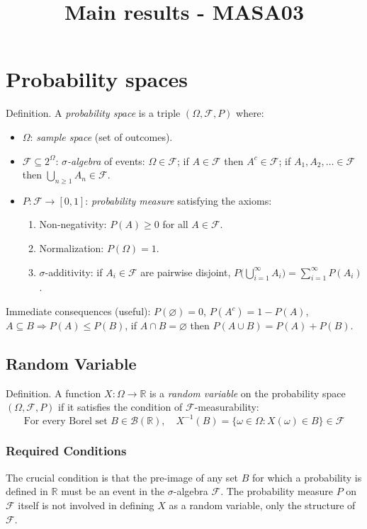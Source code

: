 \documentclass[12pt]{article}
\title{Main results - MASA03}
\author{}
\date{}
\begin{document}
\maketitle
\section*{Probability spaces}
Definition. A \emph{probability space} is a triple \((\Omega,\mathcal F,P)\) where:
\begin{itemize}[leftmargin=1.2em]
  \item \(\Omega\): \emph{sample space} (set of outcomes).
  \item \(\mathcal F\subseteq 2^\Omega\): \emph{$\sigma$-algebra} of events: 
    \(\Omega\in\mathcal F\); if \(A\in\mathcal F\) then \(A^c\in\mathcal F\); 
    if \(A_1,A_2,\dots\in\mathcal F\) then \(\bigcup_{n\ge1}A_n\in\mathcal F\).
  \item \(P:\mathcal F\to[0,1]\): \emph{probability measure} satisfying the axioms:
  \begin{enumerate}[label=(\roman*), leftmargin=1.5em]
    \item Non-negativity: \(P(A)\ge 0\) for all \(A\in\mathcal F\).
    \item Normalization: \(P(\Omega)=1\).
    \item $\sigma$-additivity: if \(A_i\in\mathcal F\) are pairwise disjoint,
      \(\displaystyle P\!\Big(\bigcup_{i=1}^\infty A_i\Big)=\sum_{i=1}^\infty P(A_i)\).
  \end{enumerate}
\end{itemize}

Immediate consequences (useful):
\(P(\varnothing)=0\), \quad \(P(A^c)=1-P(A)\), \quad 
\(A\subseteq B\Rightarrow P(A)\le P(B)\), \quad
if \(A\cap B=\varnothing\) then \(P(A\cup B)=P(A)+P(B)\).


\subsection{Random Variable}
Definition. A function $X: \Omega \to \mathbb{R}$ is a \emph{random variable} on the probability space $(\Omega, \mathcal F, P)$ if it satisfies the condition of $\mathcal F$-measurability:
$$
\text{For every Borel set } B \in \mathcal{B}(\mathbb{R}), \quad X^{-1}(B) = \{\omega \in \Omega : X(\omega) \in B\} \in \mathcal{F}
$$
\subsubsection*{Required Conditions}
The crucial condition is that the pre-image of any set $B$ for which a probability is defined in $\mathbb{R}$ must be an event in the $\sigma$-algebra $\mathcal{F}$. The probability measure $P$ on $\mathcal{F}$ itself is not involved in defining $X$ as a random variable, only the structure of $\mathcal{F}$.
\end{document}
